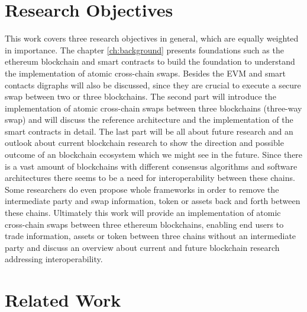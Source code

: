 %
%
\section{Research Objectives}
\label{sec:intro:goal}
This work covers three research objectives in general, which are equally weighted in importance. The chapter \ref{ch:background} presents foundations such as the ethereum blockchain and smart contracts to build the foundation to understand the implementation of atomic cross-chain swaps. Besides the \ac{EVM} and smart contacts digraphs will also be discussed, since they are crucial to execute a secure swap between two or three blockchains. The second part will introduce the implementation of atomic cross-chain swaps between three blockchains (three-way swap) and will discuss the reference architecture and the implementation of the smart contracts in detail. The last part will be all about future research and an outlook about current blockchain research to show the direction and possible outcome of an blockchain ecosystem which we might see in the future. Since there is a vast amount of blockchains with different consensus algorithms and software architectures there seems to be a need for interoperability between these chains. Some researchers do even propose whole frameworks in order to remove the intermediate party and swap information, token or assets back and forth between these chains. Ultimately this work will provide an implementation of atomic cross-chain swaps between three ethereum blockchains, enabling end users to trade information, assets or token between three chains without an intermediate party and discuss an overview about current and future blockchain research addressing interoperability.

%
%
\section{Related Work}
\label{sec:intro:relatedwork}

